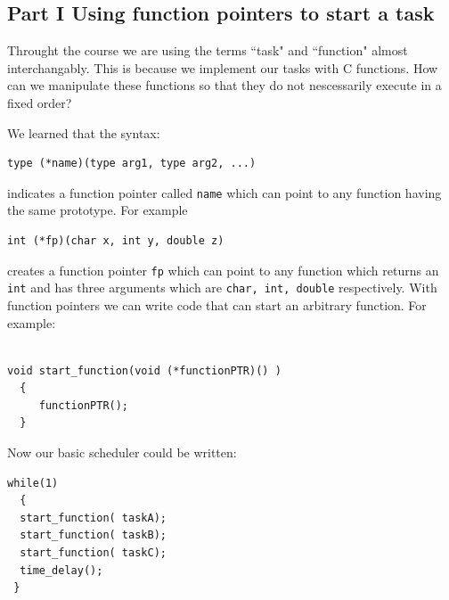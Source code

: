 
\subsection{Part I   Using function pointers to start a task}

Throught the course we are using the terms ``task" and ``function" almost interchangably.    This is because we implement our tasks with C functions. 	%
How can we manipulate these functions so that they do not nescessarily execute in a fixed order?  


We learned that the syntax:

\begin{verbatim}
type (*name)(type arg1, type arg2, ...)
\end{verbatim}
indicates a function pointer called {\tt name} which can point to any function having the same prototype.   For example

\begin{verbatim}
int (*fp)(char x, int y, double z)
\end{verbatim}

creates a function pointer {\tt fp} which can point to any function which returns an {\tt int} and has three arguments which are {\tt char, int, double} respectively.  With function pointers we can write code that can start an arbitrary function.   For example:	%

\begin{verbatim}

void start_function(void (*functionPTR)() )
  {
     functionPTR();
  }

\end{verbatim}



Now our basic scheduler could be written:

\begin{verbatim}
while(1)
  {
  start_function( taskA);
  start_function( taskB);
  start_function( taskC);
  time_delay();
 }
\end{verbatim}

